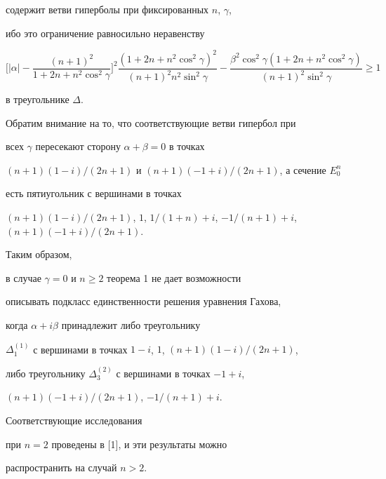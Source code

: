 содержит ветви гиперболы при фиксированных $n$, $\gamma$, 


ибо это ограничение равносильно неравенству


$$


\bigg[|\alpha|-\frac{(n+1)^2}{1+2n+n^2\cos^2\gamma}\bigg]^2


\frac{(1+2n+n^2\cos^2\gamma)^2}{(n+1)^2 n^2\sin^2\gamma}-


\frac{\beta^2\cos^2\gamma(1+2n+n^2\cos^2\gamma)}{(n+1)^2\sin^2\gamma}


\ge1


$$


в треугольнике $\Delta$. 


Обратим внимание на то, что соответствующие ветви гипербол при


всех $\gamma$ пересекают сторону $\alpha+\beta=0$ в точках


$(n+1)(1-i)/(2n+1)$ и $(n+1)(-1+i)/(2n+1)$, а сечение $E_0^n$


есть пятиугольник с вершинами в точках


$(n+1)(1-i)/(2n+1)$, $1$, $1/(1+n)+i$, $-1/(n+1)+i$, $(n+1)(-1+i)/(2n+1)$.


Таким образом,


в случае $\gamma=0$ и $n\ge2$ теорема 1 не дает возможности


описывать подкласс единственности решения уравнения Гахова,


когда $\alpha+i\beta$ принадлежит либо треугольнику 


$\Delta_1^{(1)}$ с вершинами в точках $1-i$, $1$, $(n+1)(1-i)/(2n+1)$,


либо треугольнику $\Delta_3^{(2)}$ с вершинами в точках $-1+i$,


$(n+1)(-1+i)/(2n+1)$, $-1/(n+1)+i$. 


Соответствующие исследования


при $n=2$ проведены в [1], и эти результаты можно


распространить на случай $n>2$.





